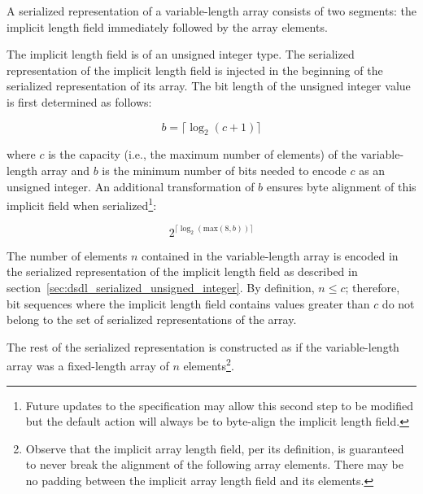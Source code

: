 A serialized representation of a variable-length array consists of two segments:
the implicit length field immediately followed by the array elements.

The implicit length field is of an unsigned integer type.
The serialized representation of the implicit length field
is injected in the beginning of the serialized representation of its array.
The bit length of the unsigned integer value is first determined as follows:

$$b=\lceil{}\log_2 (c + 1)\rceil{}$$

where $c$ is the capacity (i.e., the maximum number of elements) of the variable-length array and
$b$ is the minimum number of bits needed to encode $c$ as an unsigned integer. An additional transformation
of $b$ ensures byte alignment of this implicit field when serialized\footnote{Future updates to the specification
may allow this second step to be modified but the default action will always be to byte-align the implicit
length field.}:

$$2^{\lceil{}\log_2 (\text{max}(8, b))\rceil{}}$$

The number of elements $n$ contained in the variable-length array is encoded
in the serialized representation of the implicit length field
as described in section~\ref{sec:dsdl_serialized_unsigned_integer}.
By definition, $n \leq c$; therefore, bit sequences where the implicit length field contains values
greater than $c$ do not belong to the set of serialized representations of the array.

The rest of the serialized representation is constructed as if the variable-length array was
a fixed-length array of $n$ elements\footnote{%
    Observe that the implicit array length field, per its definition,
    is guaranteed to never break the alignment of the following array elements.
    There may be no padding between the implicit array length field and its elements.
}.

